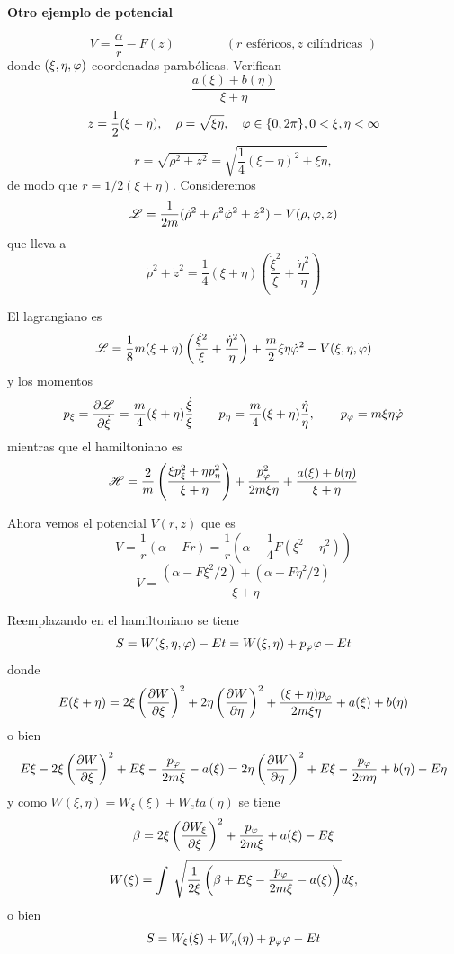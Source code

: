 \documentclass[10pt,oneside]{CBFT_book}
\begin{document}
\begin{ejemplo}{\bf Otro ejemplo de potencial}

\[
	V = \frac{\alpha}{r} - F(z) \qquad \qquad ( r \text{ esféricos}, z \text{ cilíndricas })
\]
donde $(\xi, \eta, \varphi)$ coordenadas parabólicas. Verifican
\[
	\frac{ a(\xi) + b(\eta) }{\xi + \eta}
\]
\[
	z = \frac 1 2 ( \xi - \eta ), \quad \rho =  \sqrt{\xi \eta}, \quad \varphi \in \{ 0, 2\pi \}, 0 < \xi, \eta < \infty 
\] 
\[
	r = \sqrt{ \rho^2 + z^2 } = \sqrt{ \frac{1}{4} ( \xi - \eta )^2 + \xi \eta },
\]
de modo que $r = 1/2 (\xi + \eta)$. Consideremos
\[
	\mathscr{L}  = \frac{1}{2m} ( \dot{\rho}^2 + \rho^2 \dot{\varphi}^2 + \dot{z}^2 ) - V(\rho,\varphi,z)
\]
que lleva a 
\[
	\dot{\rho}^2 + \dot{z}^2 = \frac{1}{4} ( \xi + \eta )\left( \frac{\dot{\xi}^2}{\xi} + \frac{\dot{\eta}^2}{\eta} \right)
\]

El lagrangiano es
\[
	\mathscr{L} = \frac{1}{8} m (\xi + \eta) \left( \frac{\dot{\xi}^2}{\xi} + \frac{\dot{\eta}^2}{\eta} \right) +
	\frac{m}{2}\xi\eta\dot{\varphi}^2 - V(\xi,\eta,\varphi)
\]
y los momentos 
\[
	p_\xi = \frac{\partial^{\hspace{-0.05em}} {\mathscr{L}}}{\partial {\dot{\xi}}^{\hspace{-0.05em}}} = \frac{m}{4} (\xi + \eta) \frac{\dot{\xi}}{\xi} \qquad 
	p_\eta = \frac{m}{4} (\xi + \eta) \frac{\dot{\eta}}{\eta}, \qquad
	p_\varphi = m \xi \eta \dot{ \varphi }
\]
mientras que el hamiltoniano es
\[
	\mathscr{H} = \frac{2}{m} \left( \frac{  \xi p_\xi^2 + \eta p_\eta^2  }{  \xi + \eta  } \right) + \frac{ p_\varphi^2 }{ 2 m \xi \eta } + 
	\frac{ a(\xi) + b(\eta) }{ \xi + \eta }
\]

Ahora vemos el potencial $V(r,z)$ que es 
\[
	V = \frac{1}{r} ( \alpha - Fr ) = \frac{1}{r} ( \alpha - \frac{1}{4} F ( \xi^2 - \eta^2 ) )
\]
\[
	V = \frac{( \alpha - F \xi^2 / 2 ) + ( \alpha + F \eta^2 / 2 )}{\xi + \eta}
\]
 
Reemplazando en el hamiltoniano se tiene 
\[
	S = W(\xi,\eta,\varphi) - Et = W(\xi,\eta) + p_\varphi \varphi - Et
\]
donde
\[
	E(\xi + \eta) = 2 \xi \left( \frac{\partial^{\hspace{-0.05em}} {W}}{\partial {\xi}^{\hspace{-0.05em}}} \right)^2 + 2 \eta \left( \frac{\partial^{\hspace{-0.05em}} {W}}{\partial {\eta}^{\hspace{-0.05em}}} \right)^2 + \frac{(\xi + \eta)p_\varphi}{2 m \xi \eta} + a(\xi) + b(\eta)
\]
o bien 
\[
	E\xi - 2 \xi \left( \frac{\partial^{\hspace{-0.05em}} {W}}{\partial {\xi}^{\hspace{-0.05em}}} \right)^2 + E\xi - \frac{p_\varphi}{2 m \xi} - a(\xi) =  2 \eta \left( \frac{\partial^{\hspace{-0.05em}} {W}}{\partial {\eta}^{\hspace{-0.05em}}} \right)^2 + E\xi - \frac{p_\varphi}{2 m \eta} + b(\eta) - E\eta  
\]
y como $ W(\xi,\eta) = W_\xi(\xi) + W_eta(\eta) $ se tiene 
\[
	\beta =  2 \xi \left( \frac{\partial^{\hspace{-0.05em}} {W_\xi}}{\partial {\xi}^{\hspace{-0.05em}}} \right)^2 + \frac{p_\varphi}{2 m \xi} + a(\xi) -E\xi
\]
\[
	W(\xi) = \int \; \sqrt{ \frac{1}{2\xi} \left( \beta + E\xi - \frac{p_\varphi}{2 m \xi} - a(\xi) \right)} d\xi,
\]
o bien
\[
	S = W_\xi(\xi) + W_\eta(\eta) + p_\varphi \varphi - Et
\]

\end{ejemplo}
\end{document}
